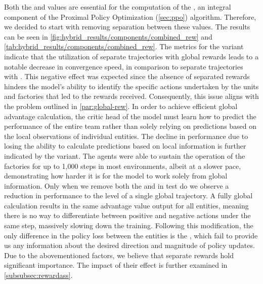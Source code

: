 \noindent Both the  and  values are essential for the computation of the , an integral component of the Proximal Policy Optimization (\autoref{sec:ppo}) algorithm. Therefore, we decided to start with removing separation between these values. The results can be seen in \autoref{fig:hybrid_results/components/combined_rew} and \autoref{tab:hybrid_results/components/combined_rew}. The metrics for the  variant indicate that the utilization of separate trajectories with global rewards leads to a notable decrease in convergence speed, in comparison to separate trajectories with . This negative effect was expected since the absence of separated rewards hinders the model's ability to identify the specific actions undertaken by the units and factories that led to the rewards received. Consequently, this issue aligns with the problem outlined in \autoref{par:global-rew}. In order to achieve efficient global advantage calculation, the critic head of the model must learn how to predict the performance of the entire team rather than solely relying on predictions based on the local observations of individual entities. The decline in performance due to losing the ability to calculate  predictions based on local information is further indicated by the  variant. The agents were able to sustain the operation of the factories for up to 1,000 steps in most environments, albeit at a slower pace, demonstrating how harder it is for the model to work solely from global information. Only when we remove both the  and  in test  do we observe a reduction in performance to the level of a single global trajectory. A fully global  calculation results in the same advantage value output for all entities, meaning there is no way to differentiate between positive and negative actions under the same step, massively slowing down the training. Following this modification, the only difference in the policy loss between the entities is the , which fail to provide us any information about the desired direction and magnitude of policy updates. Due to the abovementioned factors, we believe that separate rewards hold significant importance. The impact of their effect is further examined in \autoref{subsubsec:rewardass}.

\bigskip

